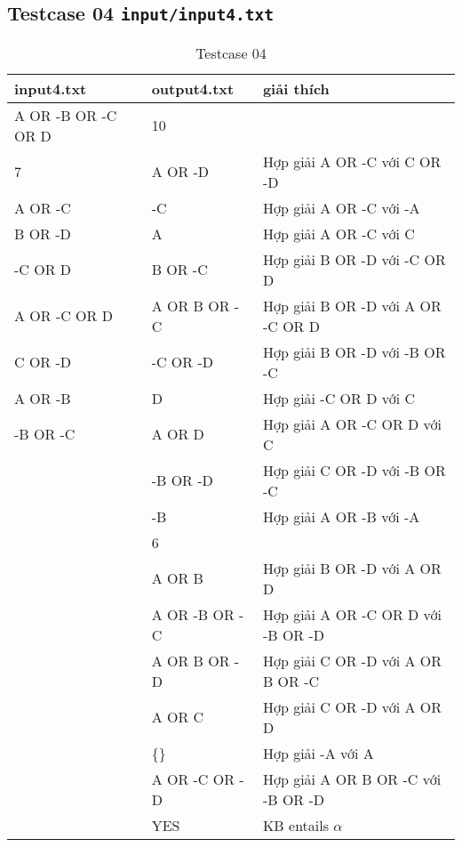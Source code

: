 \documentclass[12pt]{article}
\begin{document}
\subsection{Testcase 04 \texttt{input/input4.txt}}
\begin{table}[H]
    \centering
    \begin{tabular}{|l|l|l|}
        \hline
        input4.txt & output4.txt & giải thích  \\
        \hline
        A OR -B OR -C OR D & 10 & \\
        7 & A OR -D & Hợp giải A OR -C với C OR -D \\
        A OR -C & -C & Hợp giải A OR -C với -A \\
        B OR -D & A & Hợp giải A OR -C với C  \\
        -C OR D & B OR -C & Hợp giải B OR -D với -C OR D \\
        A OR -C OR D & A OR B OR -C & Hợp giải B OR -D với A OR -C OR D \\
        C OR -D & -C OR -D & Hợp giải B OR -D với -B OR -C \\
        A OR -B & D & Hợp giải -C OR D với C \\
        -B OR -C & A OR D & Hợp giải A OR -C OR D với C \\
         & -B OR -D & Hợp giải C OR -D với -B OR -C \\
         & -B & Hợp giải A OR -B với -A \\
         & 6 & \\
         & A OR B & Hợp giải B OR -D với A OR D \\
         & A OR -B OR -C & Hợp giải A OR -C OR D với -B OR -D \\
         & A OR B OR -D & Hợp giải C OR -D với A OR B OR -C \\
         & A OR C & Hợp giải C OR -D với A OR D \\
         & \{\} & Hợp giải -A với A \\
         & A OR -C OR -D & Hợp giải A OR B OR -C với -B OR -D \\
         & YES & KB entails $\alpha$ \\
        \hline
    \end{tabular}
    \caption{Testcase 04}
\end{table}
\end{document}
